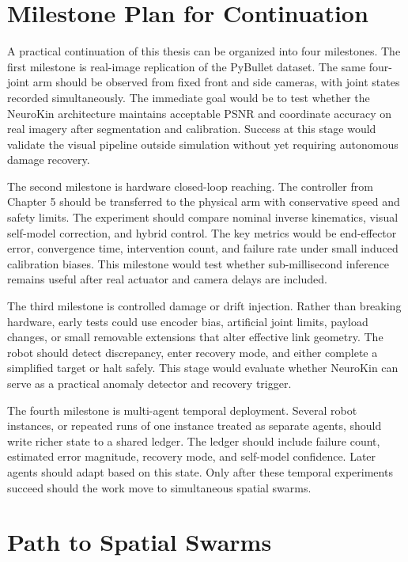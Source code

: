 \documentclass[12pt,a4paper,oneside]{report}
\begin{document}
\section{Milestone Plan for Continuation}

A practical continuation of this thesis can be organized into four milestones. The first milestone is real-image replication of the PyBullet dataset. The same four-joint arm should be observed from fixed front and side cameras, with joint states recorded simultaneously. The immediate goal would be to test whether the NeuroKin architecture maintains acceptable PSNR and coordinate accuracy on real imagery after segmentation and calibration. Success at this stage would validate the visual pipeline outside simulation without yet requiring autonomous damage recovery.

The second milestone is hardware closed-loop reaching. The controller from Chapter 5 should be transferred to the physical arm with conservative speed and safety limits. The experiment should compare nominal inverse kinematics, visual self-model correction, and hybrid control. The key metrics would be end-effector error, convergence time, intervention count, and failure rate under small induced calibration biases. This milestone would test whether sub-millisecond inference remains useful after real actuator and camera delays are included.

The third milestone is controlled damage or drift injection. Rather than breaking hardware, early tests could use encoder bias, artificial joint limits, payload changes, or small removable extensions that alter effective link geometry. The robot should detect discrepancy, enter recovery mode, and either complete a simplified target or halt safely. This stage would evaluate whether NeuroKin can serve as a practical anomaly detector and recovery trigger.

The fourth milestone is multi-agent temporal deployment. Several robot instances, or repeated runs of one instance treated as separate agents, should write richer state to a shared ledger. The ledger should include failure count, estimated error magnitude, recovery mode, and self-model confidence. Later agents should adapt based on this state. Only after these temporal experiments succeed should the work move to simultaneous spatial swarms.

\section{Path to Spatial Swarms}
\end{document}
